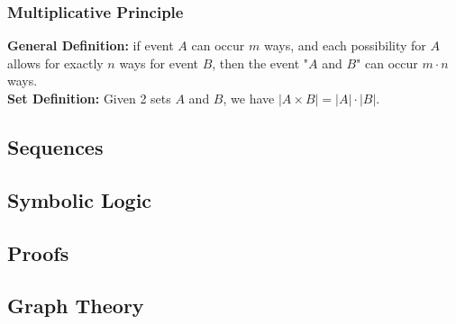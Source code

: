 \documentclass[5pt]{article}
\begin{document}
\begin{multicols}{2}
\subsubsection{Multiplicative Principle}
\textbf{General Definition:} if event $A$ can occur $m$ ways, and each possibility for $A$ allows for exactly $n$ ways for event $B$, then the event "$A$ and $B$" can occur $m\cdot n$ ways.\\
\textbf{Set Definition:} Given 2 sets $A$ and $B$, we have $|A\times B|=|A|\cdot|B|$.


\subsection{Sequences}

\subsection{Symbolic Logic}

\subsection{Proofs}

\subsection{Graph Theory}



\end{multicols}
\end{document}
